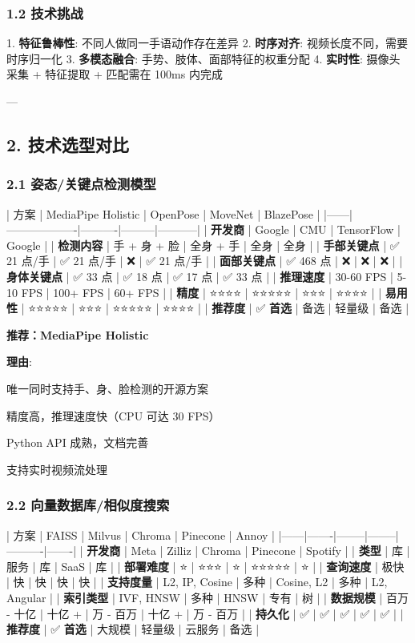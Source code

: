 \documentclass[a4paper,12pt]{article}
\begin{document}
\subsubsection{1.2 技术挑战}

1. \textbf{特征鲁棒性}: 不同人做同一手语动作存在差异
2. \textbf{时序对齐}: 视频长度不同，需要时序归一化
3. \textbf{多模态融合}: 手势、肢体、面部特征的权重分配
4. \textbf{实时性}: 摄像头采集 + 特征提取 + 匹配需在 100ms 内完成

---

\subsection{2. 技术选型对比}

\subsubsection{2.1 姿态/关键点检测模型}

| 方案 | MediaPipe Holistic | OpenPose | MoveNet | BlazePose |
|------|-------------------|----------|---------|-----------|
| \textbf{开发商} | Google | CMU | TensorFlow | Google |
| \textbf{检测内容} | 手 + 身 + 脸 | 全身 + 手 | 全身 | 全身 |
| \textbf{手部关键点} | ✅ 21 点/手 | ✅ 21 点/手 | ❌ | ✅ 21 点/手 |
| \textbf{面部关键点} | ✅ 468 点 | ❌ | ❌ | ❌ |
| \textbf{身体关键点} | ✅ 33 点 | ✅ 18 点 | ✅ 17 点 | ✅ 33 点 |
| \textbf{推理速度} | 30-60 FPS | 5-10 FPS | 100+ FPS | 60+ FPS |
| \textbf{精度} | ⭐⭐⭐⭐ | ⭐⭐⭐⭐⭐ | ⭐⭐⭐ | ⭐⭐⭐⭐ |
| \textbf{易用性} | ⭐⭐⭐⭐⭐ | ⭐⭐⭐ | ⭐⭐⭐⭐⭐ | ⭐⭐⭐⭐ |
| \textbf{推荐度} | ✅ \textbf{首选} | 备选 | 轻量级 | 备选 |

\textbf{推荐：MediaPipe Holistic}

\textbf{理由}:
\item 唯一同时支持手、身、脸检测的开源方案
\item 精度高，推理速度快（CPU 可达 30 FPS）
\item Python API 成熟，文档完善
\item 支持实时视频流处理

\subsubsection{2.2 向量数据库/相似度搜索}

| 方案 | FAISS | Milvus | Chroma | Pinecone | Annoy |
|------|-------|--------|--------|----------|-------|
| \textbf{开发商} | Meta | Zilliz | Chroma | Pinecone | Spotify |
| \textbf{类型} | 库 | 服务 | 库 | SaaS | 库 |
| \textbf{部署难度} | ⭐ | ⭐⭐⭐ | ⭐ | ⭐⭐⭐⭐⭐ | ⭐ |
| \textbf{查询速度} | 极快 | 快 | 快 | 快 | 快 |
| \textbf{支持度量} | L2, IP, Cosine | 多种 | Cosine, L2 | 多种 | L2, Angular |
| \textbf{索引类型} | IVF, HNSW | 多种 | HNSW | 专有 | 树 |
| \textbf{数据规模} | 百万 - 十亿 | 十亿 + | 万 - 百万 | 十亿 + | 万 - 百万 |
| \textbf{持久化} | ✅ | ✅ | ✅ | ✅ | ✅ |
| \textbf{推荐度} | ✅ \textbf{首选} | 大规模 | 轻量级 | 云服务 | 备选 |
\end{document}
